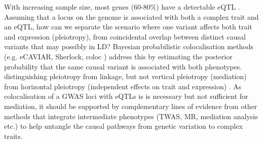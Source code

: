 \begin{outline}
With increasing sample size, most genes (60-80\%) have a detectable eQTL \autocite{vandiedonck2017GeneticAssociationMolecular}.
Assuming that a locus on the genome is associated with both a complex trait and an \gls{eQTL},
how can we separate the scenario where one variant affects both trait and expression (pleiotropy),
from coincidental overlap between distinct causal variants that may possibly in \gls{LD}?
Bayesian probabilistic colocalisation methods (e.g. eCAVIAR, Sherlock, coloc \autocite{wallace2020ElicitingPriorsRelaxing}) 
address this by estimating the posterior probability that the same causal variant is associated with both phenotypes.
distinguishing pleiotropy from linkage, 
but not vertical pleiotropy (mediation) from horizontal pleiotropy (independent effects on trait and expression) \autocite{hemani2018EvaluatingPotentialRole}.
As colocalisation of a \gls{GWAS} loci with \glspl{eQTL} is is necessary but not sufficient for mediation, 
it should be supported by complementary lines of evidence from other methods that integrate intermediate phenotypes (TWAS, MR, mediation analysis etc.) \autocite{hemani2018EvaluatingPotentialRole}
to help untangle the causal pathways from genetic variation to complex traits.
%
%
%

\end{outline}
